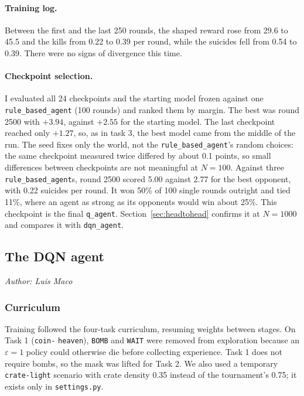 \documentclass[11pt]{article}
\newcommand{\authorline}[1]{\noindent\textit{Author: #1}\par\medskip}
\newcommand{\code}[1]{\texttt{#1}}
\begin{document}
\paragraph{Training log.} Between the first and the last 250 rounds, the shaped reward
rose from 29.6 to 45.5 and the kills from 0.22 to 0.39 per round, while the suicides fell
from 0.54 to 0.39. There were no signs of divergence this time.
 
\paragraph{Checkpoint selection.} I evaluated all 24 checkpoints and the starting model
frozen against one \code{rule\_based\_agent} (100 rounds) and ranked them by margin. The
best was round 2500 with $+3.94$, against $+2.55$ for the starting model. The last
checkpoint reached only $+1.27$, so, as in task 3, the best model came from the
middle of the run. The seed fixes only the world, not the \code{rule\_based\_agent}'s
random choices: the same checkpoint measured twice differed by about 0.1 points, so small
differences between checkpoints are not meaningful at $N = 100$. Against three
\code{rule\_based\_agent}s, round 2500 scored 5.00 against 2.77 for the best opponent,
with 0.22 suicides per round. It won 50\% of 100 single rounds outright and tied 11\%,
where an agent as strong as its opponents would win about 25\%. This checkpoint is the
final \code{q\_agent}. Section~\ref{sec:headtohead} confirms it at $N = 1000$ and compares
it with \code{dqn\_agent}.

\subsection{The DQN agent}
\label{sec:training}
\authorline{Luis Maco}

\subsubsection{Curriculum}

Training followed the four-task curriculum, resuming weights between stages. On Task 1 (\code{coin-} \code{heaven}), \code{BOMB} and \code{WAIT} were removed from exploration because an
$\varepsilon{=}1$ policy could otherwise die before collecting experience. Task 1 does not
require bombs, so the mask was lifted for Task 2. We also used a temporary \code{crate-light}
scenario with crate density 0.35 instead of the tournament's 0.75; it exists only in
\code{settings.py}.
\end{document}
